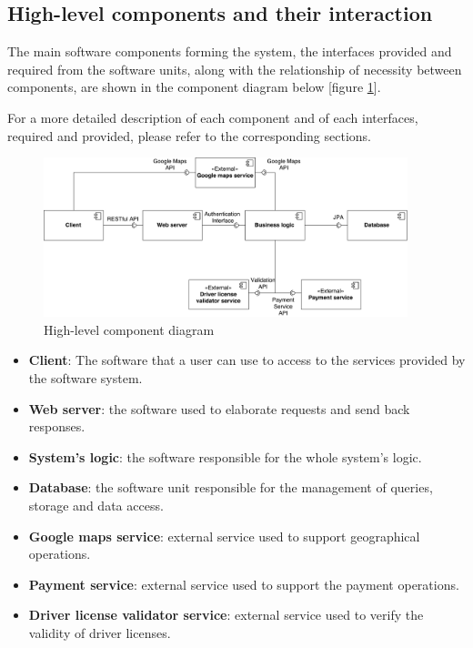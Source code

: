 \subsection{High-level components and their interaction}

The main software components forming the system, the interfaces provided and required from the software units, along with the relationship of necessity between components, are shown in the component diagram below [figure \ref{fig:high-lev-comp-diag}].

For a more detailed description of each component and of each interfaces, required and provided, please refer to the corresponding sections.
\begin{figure}[H]
	\centerline{
		\includegraphics[width=400px]{../Datas/images/high-level-component-diagram.pdf}
	}
	\caption{High-level component diagram}
	\label{fig:high-lev-comp-diag}
\end{figure}

\begin{itemize}
	\item \textbf{Client}: The software that a user can use to access to the services provided by the software system.
	\item \textbf{Web server}: the software used to elaborate requests and send back responses.
	\item \textbf{System's logic}: the software responsible for the whole system's logic.
	\item \textbf{Database}: the software unit responsible for the management of queries, storage and data access.
	\item \textbf{Google maps service}: external service used to support geographical operations.
	\item \textbf{Payment service}: external service used to support the payment operations.
	\item \textbf{Driver license validator service}: external service used to verify the validity of driver licenses.
\end{itemize}
